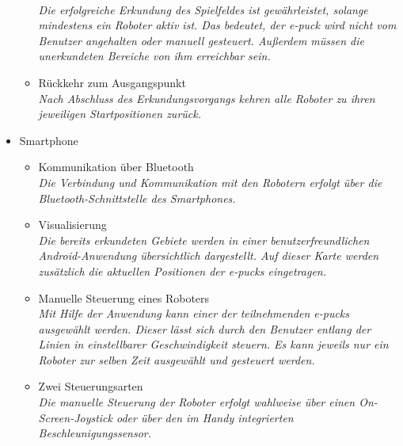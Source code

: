 \documentclass[10pt,a4paper]{article}
\begin{document}
\begin{itemize}
\begin{itemize}
						\\ \textsl{Die erfolgreiche Erkundung des Spielfeldes ist gewährleistet, solange mindestens ein Roboter aktiv ist. Das 
							bedeutet, der e-puck wird nicht vom Benutzer angehalten oder manuell gesteuert. Außerdem müssen die
							unerkundeten Bereiche von ihm erreichbar sein.}
					\item Rückkehr zum Ausgangspunkt
						\\ \textsl{Nach Abschluss des Erkundungsvorgangs kehren alle Roboter zu ihren jeweiligen Startpositionen
							zurück.}	
				\end{itemize}
				\item Smartphone
				\begin{itemize}
					\item Kommunikation über Bluetooth
						\\ \textsl{Die Verbindung und Kommunikation mit den Robotern erfolgt über die Bluetooth-Schnittstelle des
							Smartphones.}
					\item Visualisierung
						\\ \textsl{Die bereits erkundeten Gebiete werden in einer benutzerfreundlichen Android-Anwendung übersichtlich
							dargestellt. Auf dieser Karte werden zusätzlich die aktuellen Positionen der e-pucks eingetragen.}
					\item Manuelle Steuerung eines Roboters
						\\ \textsl{Mit Hilfe der Anwendung kann einer der teilnehmenden e-pucks ausgewählt werden. Dieser lässt sich
							durch den Benutzer entlang der Linien in einstellbarer Geschwindigkeit steuern. Es kann jeweils nur ein Roboter
							zur selben Zeit ausgewählt und gesteuert werden.}		
					\item Zwei Steuerungsarten
						\\ \textsl{Die manuelle Steuerung der Roboter erfolgt wahlweise über einen On-Screen-Joystick oder über
							den im Handy integrierten Beschleunigungssensor.}											
				\end{itemize}
			\end{itemize}
\end{document}
